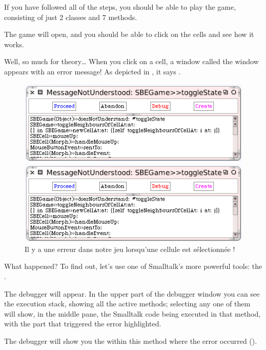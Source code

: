 \documentclass[a4paper,10pt,twoside]{book}
\begin{document}
If you have followed all of the steps, you should be able to play the game, consisting of just 2 classes and 7 methods.


The game will open, and you should be able to click on the cells and see how it works.

Well, so much for theory\ldots{}
When you click on a cell, a  window called the window appears with an error message!
As depicted in , it says .

\begin{figure}[ht]
\ifluluelse
	{\centerline{\includegraphics[width=\textwidth]{Error}}}
	{\centerline{\includegraphics[scale=0.7]{Error}}}
\caption{Il y a une erreur dans notre jeu lorsqu'une cellule est sélectionnée !
\label{fig:quintoError}}
\end{figure}

\noindent
What happened? To find out, let's use one of Smalltalk's more powerful tools: the .

The debugger will appear.
In the upper part of the debugger window you can see the execution stack, showing all the active methods; selecting any one of them will show, in the middle pane, the Smalltalk code being executed in that method, with the part that triggered the error highlighted.

The debugger will show you the  within this method where the error occurred ().
\end{document}
